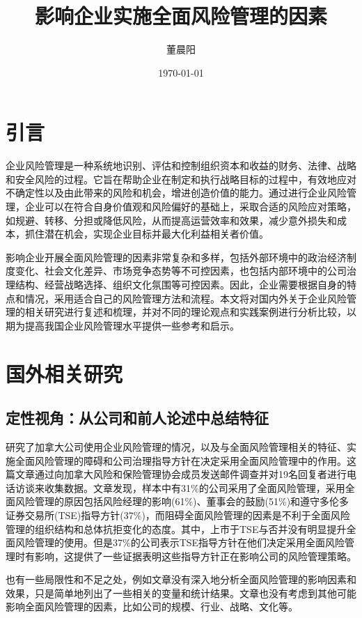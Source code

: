\documentclass[a4paper,12pt]{ctexart}
\author{董晨阳}
\date{\today}
\title{影响企业实施全面风险管理的因素}
\begin{document}
\maketitle
\clearpage
\section{引言}

企业风险管理是一种系统地识别、评估和控制组织资本和收益的财务、法律、战略和安全风险的过程。它旨在帮助企业在制定和执行战略目标的过程中，有效地应对不确定性以及由此带来的风险和机会，增进创造价值的能力。通过进行企业风险管理，企业可以在符合自身价值观和风险偏好的基础上，采取合适的风险应对策略，如规避、转移、分担或降低风险，从而提高运营效率和效果，减少意外损失和成本，抓住潜在机会，实现企业目标并最大化利益相关者价值。

影响企业开展全面风险管理的因素非常复杂和多样，包括外部环境中的政治经济制度变化、社会文化差异、市场竞争态势等不可控因素，也包括内部环境中的公司治理结构、经营战略选择、组织文化氛围等可控因素。因此，企业需要根据自身的特点和情况，采用适合自己的风险管理方法和流程。本文将对国内外关于企业风险管理的相关研究进行复述和梳理，并对不同的理论观点和实践案例进行分析比较，以期为提高我国企业风险管理水平提供一些参考和启示。

\section{国外相关研究}
\subsection{定性视角：从公司和前人论述中总结特征}
\citet{kleffner2003effect}研究了加拿大公司使用企业风险管理的情况，以及与全面风险管理相关的特征、实施全面风险管理的障碍和公司治理指导方针在决定采用全面风险管理中的作用。这篇文章通过向加拿大风险和保险管理协会成员发送邮件调查并对19名回复者进行电话访谈来收集数据。文章发现，样本中有31\%的公司采用了全面风险管理，采用全面风险管理的原因包括风险经理的影响(61\%)、董事会的鼓励(51\%)和遵守多伦多证券交易所(TSE)指导方针(37\%)，而阻碍全面风险管理的因素是不利于全面风险管理的组织结构和总体抗拒变化的态度。其中，上市于TSE与否并没有明显提升全面风险管理的使用。但是37\%的公司表示TSE指导方针在他们决定采用全面风险管理时有影响，这提供了一些证据表明这些指导方针正在影响公司的风险管理策略。

\citet{kleffner2003effect}也有一些局限性和不足之处，例如文章没有深入地分析全面风险管理的影响因素和效果，只是简单地列出了一些相关的变量和统计结果。文章也没有考虑到其他可能影响全面风险管理的因素，比如公司的规模、行业、战略、文化等。
\end{document}
